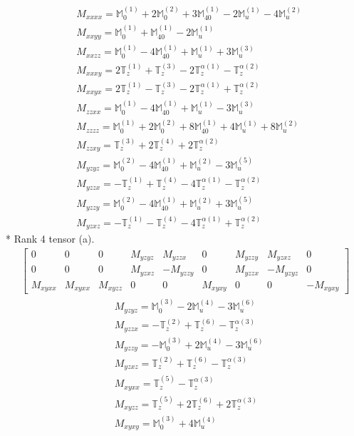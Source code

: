 \documentclass[fleqn,8pt,landscape]{jsarticle}
\begin{document}
\begin{align*}
& M_{xxxx} = \mathbb{M}_{0}^{(1)} + 2 \mathbb{M}_{0}^{(2)} + 3 \mathbb{M}_{40}^{(1)} - 2 \mathbb{M}_{u}^{(1)} - 4 \mathbb{M}_{u}^{(2)} \\
& M_{xxyy} = \mathbb{M}_{0}^{(1)} + \mathbb{M}_{40}^{(1)} - 2 \mathbb{M}_{u}^{(1)} \\
& M_{xxzz} = \mathbb{M}_{0}^{(1)} - 4 \mathbb{M}_{40}^{(1)} + \mathbb{M}_{u}^{(1)} + 3 \mathbb{M}_{u}^{(3)} \\
& M_{xxxy} = 2 \mathbb{T}_{z}^{(1)} + \mathbb{T}_{z}^{(3)} - 2 \mathbb{T}_{z}^{\alpha(1)} - \mathbb{T}_{z}^{\alpha(2)} \\
& M_{xxyx} = 2 \mathbb{T}_{z}^{(1)} - \mathbb{T}_{z}^{(3)} - 2 \mathbb{T}_{z}^{\alpha(1)} + \mathbb{T}_{z}^{\alpha(2)} \\
& M_{zzxx} = \mathbb{M}_{0}^{(1)} - 4 \mathbb{M}_{40}^{(1)} + \mathbb{M}_{u}^{(1)} - 3 \mathbb{M}_{u}^{(3)} \\
& M_{zzzz} = \mathbb{M}_{0}^{(1)} + 2 \mathbb{M}_{0}^{(2)} + 8 \mathbb{M}_{40}^{(1)} + 4 \mathbb{M}_{u}^{(1)} + 8 \mathbb{M}_{u}^{(2)} \\
& M_{zzxy} = \mathbb{T}_{z}^{(3)} + 2 \mathbb{T}_{z}^{(4)} + 2 \mathbb{T}_{z}^{\alpha(2)} \\
& M_{yzyz} = \mathbb{M}_{0}^{(2)} - 4 \mathbb{M}_{40}^{(1)} + \mathbb{M}_{u}^{(2)} - 3 \mathbb{M}_{u}^{(5)} \\
& M_{yzzx} = - \mathbb{T}_{z}^{(1)} + \mathbb{T}_{z}^{(4)} - 4 \mathbb{T}_{z}^{\alpha(1)} - \mathbb{T}_{z}^{\alpha(2)} \\
& M_{yzzy} = \mathbb{M}_{0}^{(2)} - 4 \mathbb{M}_{40}^{(1)} + \mathbb{M}_{u}^{(2)} + 3 \mathbb{M}_{u}^{(5)} \\
& M_{yzxz} = - \mathbb{T}_{z}^{(1)} - \mathbb{T}_{z}^{(4)} - 4 \mathbb{T}_{z}^{\alpha(1)} + \mathbb{T}_{z}^{\alpha(2)}
\end{align*}
* Rank 4 tensor (a).
\begin{align*}
\begin{bmatrix} 0 & 0 & 0 & M_{yzyz} & M_{yzzx} & 0 & M_{yzzy} & M_{yzxz} & 0 \\ 0 & 0 & 0 & M_{yzxz} & - M_{yzzy} & 0 & M_{yzzx} & - M_{yzyz} & 0 \\ M_{xyxx} & M_{xyxx} & M_{xyzz} & 0 & 0 & M_{xyxy} & 0 & 0 & - M_{xyxy} \end{bmatrix}
\end{align*}
\begin{align*}
& M_{yzyz} = \mathbb{M}_{0}^{(3)} - 2 \mathbb{M}_{u}^{(4)} - 3 \mathbb{M}_{u}^{(6)} \\
& M_{yzzx} = - \mathbb{T}_{z}^{(2)} + \mathbb{T}_{z}^{(6)} - \mathbb{T}_{z}^{\alpha(3)} \\
& M_{yzzy} = - \mathbb{M}_{0}^{(3)} + 2 \mathbb{M}_{u}^{(4)} - 3 \mathbb{M}_{u}^{(6)} \\
& M_{yzxz} = \mathbb{T}_{z}^{(2)} + \mathbb{T}_{z}^{(6)} - \mathbb{T}_{z}^{\alpha(3)} \\
& M_{xyxx} = \mathbb{T}_{z}^{(5)} - \mathbb{T}_{z}^{\alpha(3)} \\
& M_{xyzz} = \mathbb{T}_{z}^{(5)} + 2 \mathbb{T}_{z}^{(6)} + 2 \mathbb{T}_{z}^{\alpha(3)} \\
& M_{xyxy} = \mathbb{M}_{0}^{(3)} + 4 \mathbb{M}_{u}^{(4)}
\end{align*}
\end{document}
